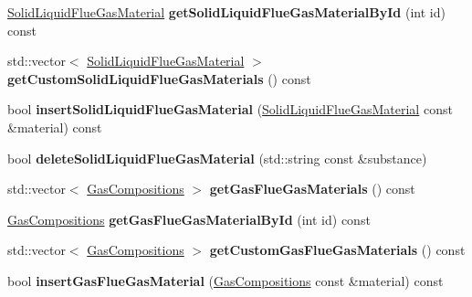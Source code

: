 \begin{DoxyCompactItemize}
\item 
\mbox{\label{class_s_q_lite_aa7ea5aa679227d695fe38848236281ee}} 
\hyperlink{class_solid_liquid_flue_gas_material}{Solid\+Liquid\+Flue\+Gas\+Material} {\bfseries get\+Solid\+Liquid\+Flue\+Gas\+Material\+By\+Id} (int id) const
\item 
\mbox{\label{class_s_q_lite_a6d11d35cd1cca7b271c64131c30dd829}} 
std\+::vector$<$ \hyperlink{class_solid_liquid_flue_gas_material}{Solid\+Liquid\+Flue\+Gas\+Material} $>$ {\bfseries get\+Custom\+Solid\+Liquid\+Flue\+Gas\+Materials} () const
\item 
\mbox{\label{class_s_q_lite_aa1de7450c37a07dfd0541fdf0dc164ef}} 
bool {\bfseries insert\+Solid\+Liquid\+Flue\+Gas\+Material} (\hyperlink{class_solid_liquid_flue_gas_material}{Solid\+Liquid\+Flue\+Gas\+Material} const \&material) const
\item 
\mbox{\label{class_s_q_lite_a56fb2567626738b5d702a73617bb28d0}} 
bool {\bfseries delete\+Solid\+Liquid\+Flue\+Gas\+Material} (std\+::string const \&substance)
\item 
\mbox{\label{class_s_q_lite_af29fd9f5c71efd6fb1d12a9403e1f433}} 
std\+::vector$<$ \hyperlink{class_gas_compositions}{Gas\+Compositions} $>$ {\bfseries get\+Gas\+Flue\+Gas\+Materials} () const
\item 
\mbox{\label{class_s_q_lite_a230049a94b9e2ff84d19fcd5a087954c}} 
\hyperlink{class_gas_compositions}{Gas\+Compositions} {\bfseries get\+Gas\+Flue\+Gas\+Material\+By\+Id} (int id) const
\item 
\mbox{\label{class_s_q_lite_a702e2e50ec461d7d47ef33990a1c353e}} 
std\+::vector$<$ \hyperlink{class_gas_compositions}{Gas\+Compositions} $>$ {\bfseries get\+Custom\+Gas\+Flue\+Gas\+Materials} () const
\item 
\mbox{\label{class_s_q_lite_a95d5521ed0de19c979ac9627ae21fbcd}} 
bool {\bfseries insert\+Gas\+Flue\+Gas\+Material} (\hyperlink{class_gas_compositions}{Gas\+Compositions} const \&material) const
\item 
\mbox{\label{class_s_q_lite_a474f1d74a2d0b9f38d474398907fea8d}} 

\end{DoxyCompactItemize}

